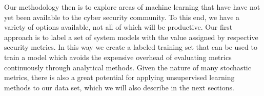 





Our methodology then is to explore areas of machine learning that have have not yet been available to the cyber security community. To this end, we have a variety of options available, not all of which will be productive. Our first approach is to label a set of system models with the value assigned by respective security metrics. In this way we create a labeled training set that can be used to train a model which avoids the expensive overhead of evaluating metrics continuously through analytical methods. Given the nature of many stochastic metrics, there is also a great potential for applying unsupervised learning methods to our data set, which we will also describe in the next sections. 